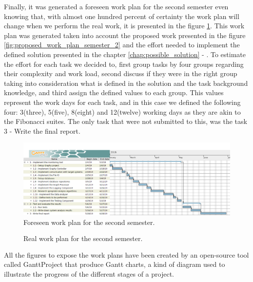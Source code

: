Finally, it was generated a foreseen work plan for the second semester even knowing that, with almost one hundred percent of certainty the work plan will change when we perform the real work, it is presented in the figure \ref{fig:foreseen_work_plan_semester_2}. This work plan was generated taken into account the proposed work presented in the figure \ref{fig:proposed_work_plan_semester_2} and the effort needed to implement the defined solution presented in the chapter \ref{chap:possible_solution} - . To estimate the effort for each task we decided to, first group tasks by four groups regarding their complexity and work load, second discuss if they were in the right group taking into consideration what is defined in the solution and the task background knowledge, and third assign the defined values to each group. This values represent the work days for each task, and in this case we defined the following four: 3(three), 5(five), 8(eight) and 12(twelve) working days as they are akin to the Fibonacci suites\cite{project_estimation_times}. The only task that were not submitted to this, was the task 3 - Write the final report.

\begin{figure}[H]
    \centering
    \includegraphics[width=1.00\textwidth]{images/foreseen_work_plan_semester_2.pdf}
    \caption{Foreseen work plan for the second semester.}
    \label{fig:foreseen_work_plan_semester_2}
\end{figure}

\begin{figure}[H]
    \centering
    \caption{Real work plan for the second semester.}
    \label{fig:real_work_plan_semester_2}
\end{figure}

All the figures to expose the work plans have been created by an open-source tool called GanttProject\cite{gantt_project_tool} that produce Gantt charts, a kind of diagram used to illustrate the progress of the different stages of a project.

\checkoddpage
{}
{ %
\newpage
\blankpage}
{ %
}
